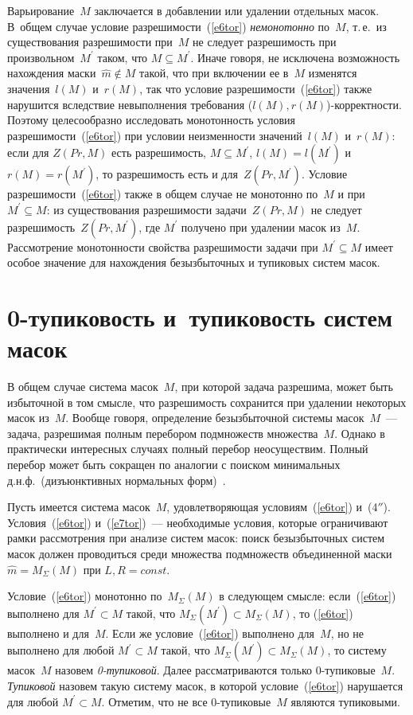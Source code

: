 \begin{multicols}{2}
    Варьирование~$M$ заключается в добавлении или удалении отдельных 
масок. В~общем случае условие разрешимости~(\ref{e6tor}) \textit{немонотонно} 
по~$M$, т.\,е.\ из существования разрешимости при~$M$ не 
следует разрешимость при произвольном~$M^\prime$ таком, что $M\subseteq 
M^\prime$. Иначе говоря, не исключена возможность нахождения 
маски~$\hat{m} \notin M$ такой, что при включении ее в~$M$ изменятся 
значения~$l(M)$ и~$r(M)$, так что условие разрешимости~(\ref{e6tor}) также 
нарушится вследствие невыполнения требования 
($l(M),r(M)$)-кор\-рект\-ности. Поэтому целесообразно исследовать 
монотонность условия раз\-ре\-ши\-мости~(\ref{e6tor}) при условии неизменности 
значений~$l(M)$ и~$r(M)$: если для $Z(Pr, M)$ есть разрешимость, $M 
\subseteq M^\prime$, $l(M)= l(M^\prime)$ и $r(M)= r(M^\prime)$, то 
разрешимость есть и для~$Z(Pr, M^\prime)$. Условие 
раз\-ре\-ши\-мости~(\ref{e6tor}) также в общем случае не монотонно по~$M$ и при 
$M^\prime \subseteq M$:  из существования разрешимости задачи~$Z(Pr, M)$ не 
следует разрешимость~$Z(Pr, M^\prime)$, где $M^\prime$ получено при 
удалении масок из~$M$. Рассмотрение монотонности свойства разрешимости 
задачи при $M^\prime\subseteq M$ имеет особое значение для нахождения 
безызбыточных и тупиковых систем масок.
{ %

}

\section{0-тупиковость и~тупиковость систем масок}

    В общем случае система масок~$M$, при которой задача разрешима, 
может быть избыточной в том смысле, что разрешимость сохранится при 
удалении некоторых масок из~$M$. Вообще говоря, определение 
безызбыточной системы масок~$M$~--- задача, разрешимая полным перебором 
подмножеств множества~$M$. Однако в практически интересных случаях 
полный перебор неосуществим. Полный  перебор может быть сокращен по 
аналогии с поиском минимальных д.н.ф.\ (дизъюнктивных нормальных 
форм)~\cite{15tor}. 

    Пусть имеется система масок~$M$, удовлетворяющая 
условиям~(\ref{e6tor}) и~(4$''$). Условия~(\ref{e6tor}) и~(\ref{e7tor})~--- необходимые 
условия, которые ограничивают рамки рассмотрения при анализе систем масок: 
поиск безызбыточных систем масок должен проводиться среди множества 
подмножеств объединенной маски $\hat{m} =M_\Sigma(M)$ при $L, R = const$. 

    Условие~(\ref{e6tor}) монотонно по~$M_\Sigma(M)$ в следующем 
смысле: если~(\ref{e6tor}) выполнено для $M^\prime \subset M$ такой, что 
$M_\Sigma (M^\prime )\subset M_\Sigma(M)$, то (\ref{e6tor}) выполнено и 
для~$M$. Если же условие~(\ref{e6tor}) выполнено для~$M$, но не выполнено 
для любой $M^\prime \subset M$ такой, что $M_\Sigma(M^\prime)\subset 
M_\Sigma(M)$, то систему масок~$M$ назовем \textit{0-ту\-пи\-ко\-вой}. Далее 
рассматриваются только 0-ту\-пи\-ко\-вые~$M$. \textit{Тупиковой} назовем 
такую систему масок, в которой условие~(\ref{e6tor}) нарушается для любой 
$M^\prime\subset M$. Отметим, что не все 0-ту\-пи\-ко\-вые~$M$ являются 
тупиковыми. 
{

}
\end{multicols}
